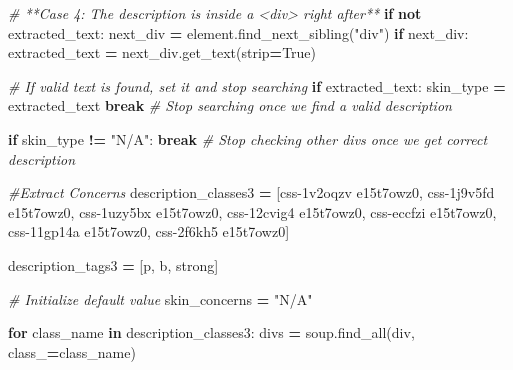 \documentclass[
]{article}
\newenvironment{Shaded}{\begin{snugshade}}{\end{snugshade}}
\newcommand{\CommentTok}[1]{\textcolor[rgb]{0.56,0.35,0.01}{\textit{#1}}}
\newcommand{\ControlFlowTok}[1]{\textcolor[rgb]{0.13,0.29,0.53}{\textbf{#1}}}
\newcommand{\KeywordTok}[1]{\textcolor[rgb]{0.13,0.29,0.53}{\textbf{#1}}}
\newcommand{\NormalTok}[1]{#1}
\newcommand{\OperatorTok}[1]{\textcolor[rgb]{0.81,0.36,0.00}{\textbf{#1}}}
\newcommand{\StringTok}[1]{\textcolor[rgb]{0.31,0.60,0.02}{#1}}
\newcommand{\VariableTok}[1]{\textcolor[rgb]{0.00,0.00,0.00}{#1}}
\begin{document}
\begin{Shaded}
\begin{Highlighting}[]
                \CommentTok{\# **Case 4: The description is inside a \textasciigrave{}\textless{}div\textgreater{}\textasciigrave{} right after**}
                \ControlFlowTok{if} \KeywordTok{not}\NormalTok{ extracted\_text:}
\NormalTok{                  next\_div }\OperatorTok{=}\NormalTok{ element.find\_next\_sibling(}\StringTok{"div"}\NormalTok{)}
                  \ControlFlowTok{if}\NormalTok{ next\_div:}
\NormalTok{                    extracted\_text }\OperatorTok{=}\NormalTok{ next\_div.get\_text(strip}\OperatorTok{=}\VariableTok{True}\NormalTok{)}

                \CommentTok{\# If valid text is found, set it and stop searching}
                \ControlFlowTok{if}\NormalTok{ extracted\_text:}
\NormalTok{                  skin\_type }\OperatorTok{=}\NormalTok{ extracted\_text}
                  \ControlFlowTok{break} \CommentTok{\# Stop searching once we find a valid description}

            \ControlFlowTok{if}\NormalTok{ skin\_type }\OperatorTok{!=} \StringTok{"N/A"}\NormalTok{:}
              \ControlFlowTok{break}  \CommentTok{\# Stop checking other divs once we get correct description}
            
        \CommentTok{\#Extract Concerns}
\NormalTok{        description\_classes3 }\OperatorTok{=}\NormalTok{ [}\StringTok{\textquotesingle{}css{-}1v2oqzv e15t7owz0\textquotesingle{}}\NormalTok{,}
        \StringTok{\textquotesingle{}css{-}1j9v5fd e15t7owz0\textquotesingle{}}\NormalTok{, }\StringTok{\textquotesingle{}css{-}1uzy5bx e15t7owz0\textquotesingle{}}\NormalTok{,}
        \StringTok{\textquotesingle{}css{-}12cvig4 e15t7owz0\textquotesingle{}}\NormalTok{, }\StringTok{\textquotesingle{}css{-}eccfzi e15t7owz0\textquotesingle{}}\NormalTok{,}
        \StringTok{\textquotesingle{}css{-}11gp14a e15t7owz0\textquotesingle{}}\NormalTok{, }\StringTok{\textquotesingle{}css{-}2f6kh5 e15t7owz0\textquotesingle{}}\NormalTok{]}

\NormalTok{        description\_tags3 }\OperatorTok{=}\NormalTok{ [}\StringTok{\textquotesingle{}p\textquotesingle{}}\NormalTok{, }\StringTok{\textquotesingle{}b\textquotesingle{}}\NormalTok{, }\StringTok{\textquotesingle{}strong\textquotesingle{}}\NormalTok{]}

        \CommentTok{\# Initialize default value}
\NormalTok{        skin\_concerns }\OperatorTok{=} \StringTok{"N/A"}

        \ControlFlowTok{for}\NormalTok{ class\_name }\KeywordTok{in}\NormalTok{ description\_classes3:}
\NormalTok{          divs }\OperatorTok{=}\NormalTok{ soup.find\_all(}\StringTok{\textquotesingle{}div\textquotesingle{}}\NormalTok{, class\_}\OperatorTok{=}\NormalTok{class\_name)}


\end{Highlighting}
\end{Shaded}
\end{document}
